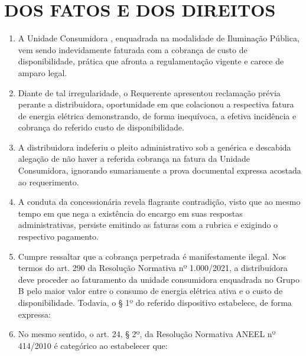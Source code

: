 \newcommand{\tipoRequerimento}{custo de disponibilidade}

\section{DOS FATOS E DOS DIREITOS}

\begin{enumerate}[resume]
\item A Unidade Consumidora \unidadeConsumidora{}, enquadrada na modalidade de Iluminação Pública, vem sendo indevidamente faturada com a cobrança de custo de disponibilidade, prática que afronta a regulamentação vigente e carece de amparo legal.

\item Diante de tal irregularidade, o Requerente apresentou reclamação prévia perante a distribuidora, oportunidade em que colacionou a respectiva fatura de energia elétrica demonstrando, de forma inequívoca, a efetiva incidência e cobrança do referido custo de disponibilidade.

\item A distribuidora indeferiu o pleito administrativo sob a genérica e descabida alegação de não haver a referida cobrança na fatura da Unidade Consumidora, ignorando sumariamente a prova documental expressa acostada ao requerimento.

\item A conduta da concessionária revela flagrante contradição, visto que ao mesmo tempo em que nega a existência do encargo em suas respostas administrativas, persiste emitindo as faturas com a rubrica e exigindo o respectivo pagamento.

\item Cumpre ressaltar que a cobrança perpetrada é manifestamente ilegal. Nos termos do art. 290 da Resolução Normativa nº 1.000/2021, a distribuidora deve proceder ao faturamento da unidade consumidora enquadrada no Grupo B pelo maior valor entre o consumo de energia elétrica ativa e o custo de disponibilidade. Todavia, o § 1º do referido dispositivo estabelece, de forma expressa:

\item No mesmo sentido, o art. 24, § 2º, da Resolução Normativa ANEEL nº 414/2010 é categórico ao estabelecer que:
\end{enumerate}
